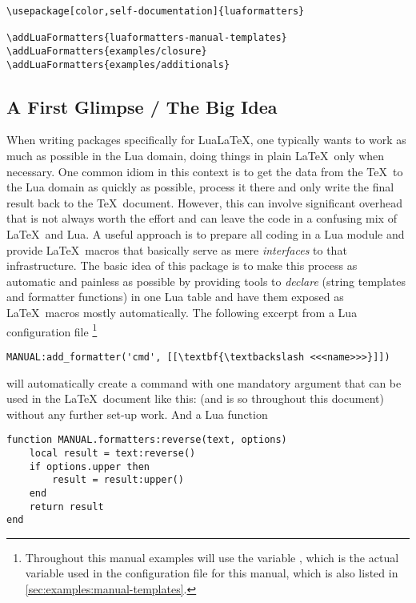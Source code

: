 \documentclass[12pt]{scrartcl}
\begin{document}
\begin{verbatim}
\usepackage[color,self-documentation]{luaformatters}

\addLuaFormatters{luaformatters-manual-templates}
\addLuaFormatters{examples/closure}
\addLuaFormatters{examples/additionals}
\end{verbatim}


\subsection{A First Glimpse / The Big Idea}
\label{sec:a-first-glimpse}

When writing packages specifically for Lua\LaTeX, one typically wants to work as
much as possible in the Lua domain, doing things in plain \LaTeX\ only when
necessary.  One common idiom in this context is to get the data from the \TeX\
to the Lua domain as quickly as possible, process it there and only write the
final result back to the \TeX\ document.  However, this can involve significant
overhead that is not always worth the effort and can leave the code in a
confusing mix of \LaTeX\ and Lua.  A useful approach is to prepare all coding in
a Lua module and provide \LaTeX\ macros that basically serve as mere
\emph{interfaces} to that infrastructure.  The basic idea of this package is to
make this process as automatic and painless as possible by providing tools to
\emph{declare} \term{Formatters} (string templates and formatter functions) in
one Lua table and have them exposed as \LaTeX\ macros mostly automatically.  The
following excerpt from a Lua configuration file%
\footnote{Throughout this manual examples will use the variable ,
which is the actual variable used in the configuration file for this manual,
which is also listed in \vref{sec:examples:manual-templates}.}%

\begin{verbatim}
MANUAL:add_formatter('cmd', [[\textbf{\textbackslash <<<name>>>}]])
\end{verbatim}

\noindent will automatically create a command  with one
mandatory argument that can be used in the \LaTeX\ document like this:
\luaMacroDocInline[demo,args=usepackage]{cmd} (and is so throughout this
document) without any further set-up work.  And a Lua function

\label{code:function}
\begin{verbatim}
function MANUAL.formatters:reverse(text, options)
    local result = text:reverse()
    if options.upper then
        result = result:upper()
    end
    return result
end
\end{verbatim}
\end{document}
